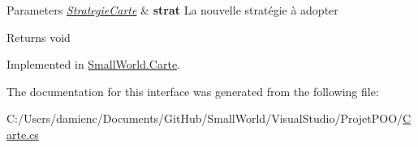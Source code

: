 \begin{DoxyParams}{Parameters}
{\em \hyperlink{class_small_world_1_1_strategie_carte}{Strategie\-Carte}} & {\bfseries strat} La nouvelle stratégie à adopter \\
\hline
\end{DoxyParams}
\begin{DoxyReturn}{Returns}
void 
\end{DoxyReturn}


Implemented in \hyperlink{class_small_world_1_1_carte_aad692a68904925a11d5307181ca83c5f}{Small\-World.\-Carte}.



The documentation for this interface was generated from the following file\-:\begin{DoxyCompactItemize}
\item 
C\-:/\-Users/damienc/\-Documents/\-Git\-Hub/\-Small\-World/\-Visual\-Studio/\-Projet\-P\-O\-O/\hyperlink{_carte_8cs}{Carte.\-cs}\end{DoxyCompactItemize}
